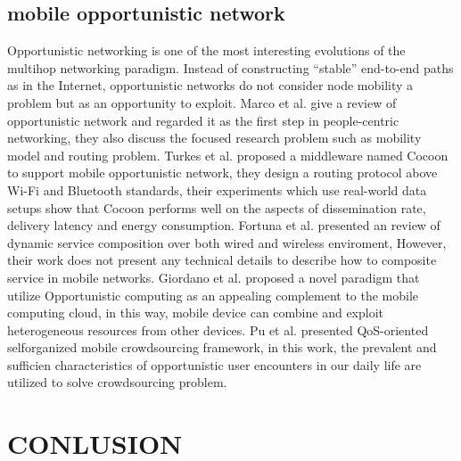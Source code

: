\documentclass[10pt,journal,compsoc]{IEEEtran}
\begin{document}
\subsection{mobile opportunistic network}
Opportunistic networking is one of the most interesting evolutions of the multihop networking paradigm. Instead of constructing “stable” end-to-end paths as in the Internet, opportunistic networks do not consider node mobility a problem but as an opportunity to exploit. 
Marco et al. \cite{Conti2014} give a review of opportunistic network and regarded it as the first step in people-centric networking, they also discuss the focused research problem such as mobility model and routing problem.
Turkes et al. \cite{turkes2016cocoon} proposed a middleware named Cocoon to support mobile opportunistic network, they design a routing protocol above Wi-Fi and Bluetooth standards, their experiments which use real-world data setups show that Cocoon performs well on the aspects of dissemination rate, delivery latency and energy consumption.
Fortuna et al. \cite{fortuna2009dynamic} presented an review of dynamic service composition over both wired and wireless enviroment, However, their work does not present any technical details to describe how to composite service in mobile networks.
Giordano et al. \cite{Giordano2011} proposed a novel paradigm that utilize Opportunistic computing as an appealing complement to the mobile computing cloud, in this way, mobile device can combine and exploit heterogeneous resources from other devices.
Pu et al. \cite{Pu2017} presented QoS-oriented selforganized mobile crowdsourcing framework, in this work, the prevalent and sufficien characteristics of opportunistic user encounters in our daily life are utilized to solve crowdsourcing problem.
\section{CONLUSION}





\end{document}
